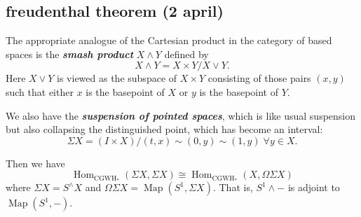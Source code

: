 \documentclass{article}
\DeclareMathOperator{\CGWH}{CGWH}
\DeclareMathOperator{\Hom}{Hom}
\DeclareMathOperator{\Map}{Map}
\begin{document}
\subsection{freudenthal theorem (2 april)}
\begin{defn}
	The appropriate analogue of the Cartesian product in the category of based spaces is the \textbf{\textit{smash product}} $X\wedge Y$ defined by
	\[X\wedge Y=X\times Y/X\vee Y.\]
	Here $X\vee Y$ is viewed as the subspace of $X\times Y$ consisting of those pairs $(x,y)$ such that either $x$ is the basepoint of $X$ or $y$ is the basepoint of $Y$.
\end{defn}
We also have the \textbf{\textit{suspension of pointed spaces}}, which is like usual suspension but also collapsing the distinguished point, which has become an interval:
\[\Sigma X=(I\times X)/(t,x)\sim (0,y)\sim (1,y)\;\forall y\in X.\]


Then we have
\[\Hom_{\CGWH_*}(\Sigma X,\Sigma X)\cong\Hom_{\CGWH_*}(X,\Omega\Sigma X)\]
where $\Sigma X=S^\wedge X$ and $\Omega\Sigma X=\Map(S^1,\Sigma X)$. That is, $S^1\wedge-$ is adjoint to $\Map(S^1,-)$.
\end{document}

